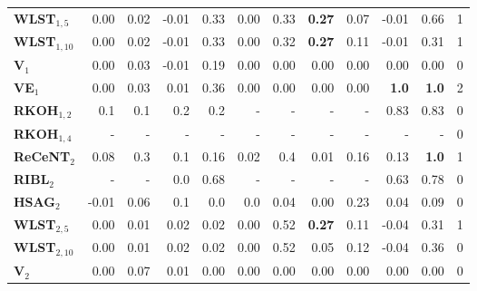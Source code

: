\begin{table}[t]
{\begin{tabular}[t]{@{}lrrrrrrrrrrr@{}}
	\textbf{WLST$_{1,5}$}    & 0.00 & 0.02        &    -0.01    	&   0.33     &    0.00 	 & 0.33 & \textbf{0.27} & 0.07  & -0.01 & 0.66 & 1      \\

	\textbf{WLST$_{1,10}$}    & 0.00 & 0.02      &   -0.01    & 0.33        &   0.00  & 0.32  & \textbf{0.27} & 0.11 & -0.01 & 0.31 & 1       \\

	\textbf{V$_1$}    & 0.00  & 0.03         &   -0.01       	&   0.19      &   0.00    	 &  0.00   & 0.00 & 0.00  & 0.00 & 0.00 & 0     \\

	\textbf{VE$_1$}    & 0.00 & 0.03         &     0.01   	& 0.36         &  0.00 	 & 0.00   &0.00  & 0.00 & \textbf{1.0}  &  \textbf{1.0} & 2     \\

	\textbf{RKOH$_{1,2}$}    & 0.1 & 0.1         &  0.2      	&   0.2       &  - 	 & -   & -  & - 			& 0.83  &  0.83 & 0    \\

	\textbf{RKOH$_{1,4}$}    & - & -         &     -   	& -         &  - 	 & -   & -  & - 			&  -  & - & 0     \\
	\midrule
	\textbf{ReCeNT$_2$}    &  0.08  & 0.3    & 0.1	 	&  0.16  	    	  &  0.02   &  0.4 & 0.01 & 0.16 & 0.13 & \textbf{1.0} & 1 \\

	\textbf{RIBL$_2$}    &  -            &   -		     &   0.0			&  0.68    &  -              &  -     & - & -   & 0.63 & 0.78 & 0   \\

	\textbf{HSAG$_2$}    &  -0.01          &   0.06	         &   0.1     	 	&  0.0          	  &  0.0       	  	  &  0.04      & 0.00 & 0.23  & 0.04 & 0.09 & 0  \\

	\textbf{WLST$_{2,5}$}    &     0.00    &   0.01      &   0.02	 	&  0.02        	  &     0.00 &  0.52  & \textbf{0.27} & 0.11   & -0.04 & 0.31 & 1  \\

	\textbf{WLST$_{2,10}$}    &      0.00      &  0.01       &   	 0.02	&  0.02        	  &     0.00  &  0.52  & 0.05 & 0.12  & -0.04 & 0.36 & 0   \\

	\textbf{V$_2$}    &    0.00     &   0.07     &     0.01 	 	&   0.00      	  &       0.00	  & 0.00 & 0.00 & 0.00  & 0.00 & 0.00 & 0  \\


\end{tabular}}
\end{table}
